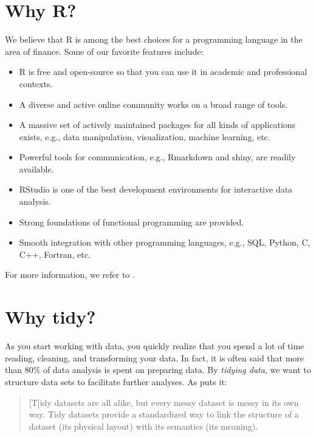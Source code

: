 \documentclass[
]{book}
\providecommand{\tightlist}{%
  \setlength{\itemsep}{0pt}\setlength{\parskip}{0pt}}
\begin{document}
\hypertarget{why-r}{%
\section*{Why R?}\label{why-r}}


We believe that R is among the best choices for a programming language in the area of finance. Some of our favorite features include:

\begin{itemize}
\tightlist
\item
  R is free and open-source so that you can use it in academic and professional contexts.
\item
  A diverse and active online community works on a broad range of tools.
\item
  A massive set of actively maintained packages for all kinds of applications exists, e.g., data manipulation, visualization, machine learning, etc.
\item
  Powerful tools for communication, e.g., Rmarkdown and shiny, are readily available.
\item
  RStudio is one of the best development environments for interactive data analysis.
\item
  Strong foundations of functional programming are provided.
\item
  Smooth integration with other programming languages, e.g., SQL, Python, C, C++, Fortran, etc.
\end{itemize}

For more information, we refer to \citet{Wickham2019}.

\hypertarget{why-tidy}{%
\section*{Why tidy?}\label{why-tidy}}


As you start working with data, you quickly realize that you spend a lot of time reading, cleaning, and transforming your data. In fact, it is often said that more than 80\% of data analysis is spent on preparing data. By \emph{tidying data}, we want to structure data sets to facilitate further analyses. As \citet{Wickham2014} puts it:

\begin{quote}
{[}T{]}idy datasets are all alike, but every messy dataset is messy in its own way. Tidy datasets provide a standardized way to link the structure of a dataset (its physical layout) with its semantics (its meaning).
\end{quote}
\end{document}
